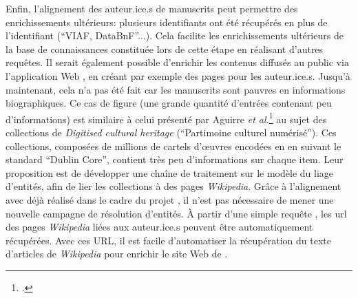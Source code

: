Enfin, l'alignement des auteur.ice.s de manuscrits peut permettre des enrichissements ultérieurs: plusieurs identifiants ont été récupérés en plus de l'identifiant \wkd{} (\enquote{VIAF, DataBnF}...). Cela facilite les enrichissements ultérieurs de la base de connaissances constituée lors de cette étape en réalisant d'autres requêtes. Il serait également possible d'enrichir les contenus diffusés au public via l'application Web \ktb{}, en créant par exemple des pages pour les auteur.ice.s. Jusqu'à maintenant, cela n'a pas été fait car les manuscrits sont pauvres en informations biographiques. Ce cas de figure (une grande quantité d'entrées contenant peu d'informations) est similaire à celui présenté par Aguirre \textit{et al.}\footcite[p. 1]{agirre_matching_2012} au sujet des collections de \textit{Digitised cultural heritage} (\enquote{Partimoine culturel numérisé}). Ces collections, composées de millions de cartels d'œuvres encodées en \xml{} en suivant le standard \enquote{Dublin Core}, contient très peu d'informations sur chaque item. Leur proposition est de développer une chaîne de traitement sur le modèle du liage d'entités, afin de lier les collections à des pages \textit{Wikipedia}. Grâce à l'alignement avec \wkd{} déjà réalisé dans le cadre du projet \ktb{}, il n'est pas nécessaire de mener une nouvelle campagne de résolution d'entités. À partir d'une simple requête \sparql{}, les \gls{url} des pages \textit{Wikipedia} liées aux auteur.ice.s peuvent être automatiquement récupérées. Avec ces URL, il est facile d'automatiser la récupération du texte d'articles de \textit{Wikipedia} pour enrichir le site Web de \ktb{}.

